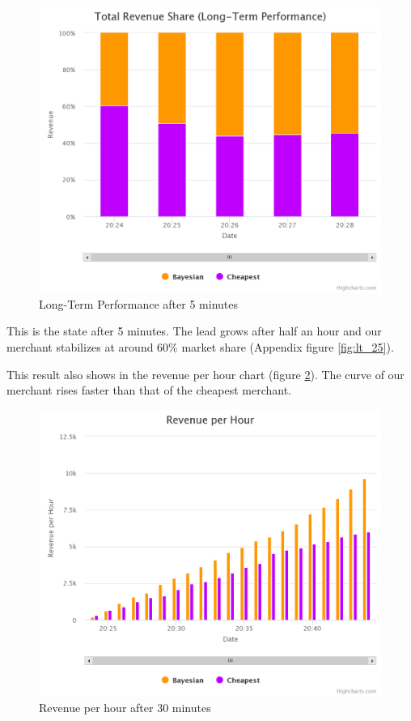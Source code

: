 \documentclass[sigconf]{acmart}
\begin{document}
\begin{figure}[!htb]
  \includegraphics[width=\columnwidth]{pictures/lt_5.png}
  \caption{Long-Term Performance after 5 minutes}
  \label{fig:lt_5}
\end{figure}

This is the state after 5 minutes. The lead grows after half an hour and our merchant stabilizes at around 60\% market share (Appendix figure \ref{fig:lt_25}).

This result also shows in the revenue per hour chart (figure \ref{fig:rh_25}). The curve of our merchant rises faster than that of the cheapest merchant.

\begin{figure}[!htb]
  \includegraphics[width=\columnwidth]{pictures/rh_25.png}
  \caption{Revenue per hour after 30 minutes}
  \label{fig:rh_25}
\end{figure}
\end{document}
